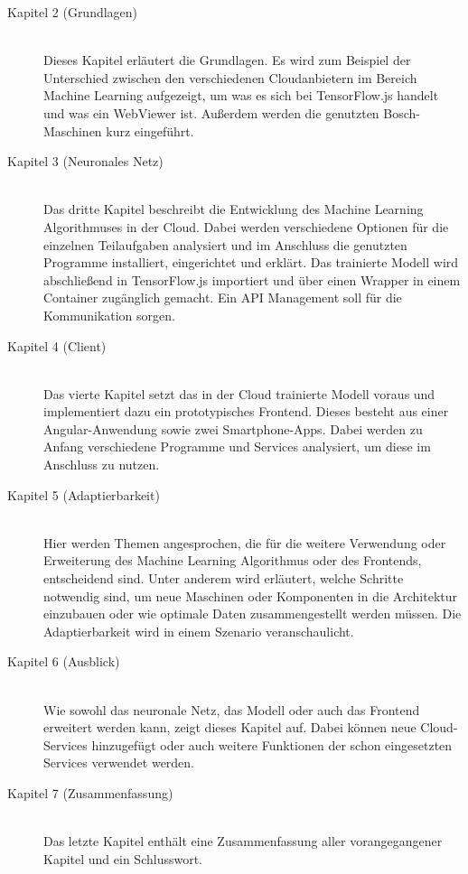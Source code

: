 \begin{description}

    \item[Kapitel 2 (Grundlagen)]\hfill \\
    Dieses Kapitel erläutert die Grundlagen. Es wird zum Beispiel der Unterschied zwischen den verschiedenen
    Cloudanbietern im Bereich Machine Learning aufgezeigt, um was es sich bei TensorFlow.js handelt und was ein WebViewer
    ist. Außerdem werden die genutzten Bosch-Maschinen kurz eingeführt.

    \item[Kapitel 3 (Neuronales Netz)]\hfill \\
    Das dritte Kapitel beschreibt die Entwicklung des Machine Learning Algorithmuses in der Cloud. Dabei werden
    verschiedene Optionen für die einzelnen Teilaufgaben analysiert und im Anschluss die genutzten Programme
    installiert, eingerichtet und erklärt. Das trainierte Modell wird abschließend in TensorFlow.js importiert und über
    einen Wrapper in einem Container zugänglich gemacht. Ein API Management soll für die Kommunikation sorgen.

    \item[Kapitel 4 (Client)]\hfill \\
    Das vierte Kapitel setzt das in der Cloud trainierte Modell voraus und implementiert dazu ein prototypisches
    Frontend. Dieses besteht aus einer Angular-Anwendung sowie zwei Smartphone-Apps. Dabei werden zu Anfang verschiedene
    Programme und Services analysiert, um diese im Anschluss zu nutzen.

    \item[Kapitel 5 (Adaptierbarkeit)]\hfill \\
    Hier werden Themen angesprochen, die für die weitere Verwendung oder Erweiterung des Machine Learning Algorithmus
    oder des Frontends, entscheidend sind. Unter anderem wird erläutert, welche Schritte notwendig sind, um neue
    Maschinen oder Komponenten in die Architektur einzubauen oder wie optimale Daten zusammengestellt werden müssen. Die
    Adaptierbarkeit wird in einem Szenario veranschaulicht.

    \item[Kapitel 6 (Ausblick)]\hfill \\
    Wie sowohl das neuronale Netz, das Modell oder auch das Frontend erweitert werden kann, zeigt dieses Kapitel auf.
    Dabei können neue Cloud-Services hinzugefügt oder auch weitere Funktionen der schon eingesetzten Services verwendet
    werden.

    \item[Kapitel 7 (Zusammenfassung)]\hfill \\
    Das letzte Kapitel enthält eine Zusammenfassung aller vorangegangener Kapitel und ein Schlusswort.

\end{description}

